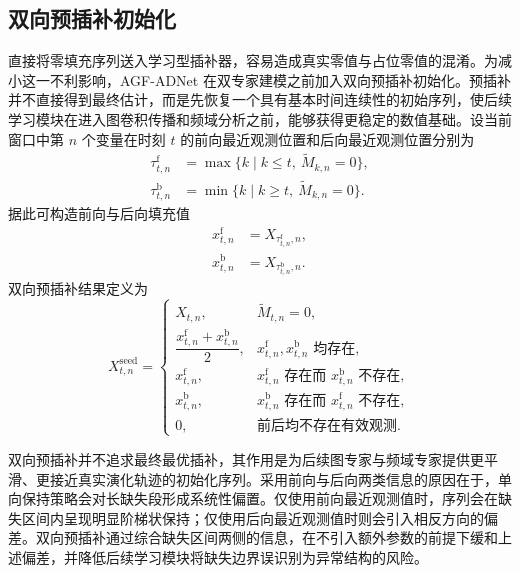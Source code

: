 \documentclass[bachelor, vlined]{DissertUESTC}
\begin{document}
    \subsection{双向预插补初始化}

    直接将零填充序列送入学习型插补器，容易造成真实零值与占位零值的混淆。为减小这一不利影响，AGF-ADNet 在双专家建模之前加入双向预插补初始化。预插补并不直接得到最终估计，而是先恢复一个具有基本时间连续性的初始序列，使后续学习模块在进入图卷积传播和频域分析之前，能够获得更稳定的数值基础。设当前窗口中第 $n$ 个变量在时刻 $t$ 的前向最近观测位置和后向最近观测位置分别为
    \begin{align}
        \tau_{t,n}^{\mathrm{f}} &= \max\{k \mid k \leq t,\ \widetilde{M}_{k,n}=0\}, \\
        \tau_{t,n}^{\mathrm{b}} &= \min\{k \mid k \geq t,\ \widetilde{M}_{k,n}=0\}.
    \end{align}
    据此可构造前向与后向填充值
    \begin{align}
        x_{t,n}^{\mathrm{f}} &= X_{\tau_{t,n}^{\mathrm{f}},n}, \\
        x_{t,n}^{\mathrm{b}} &= X_{\tau_{t,n}^{\mathrm{b}},n}.
    \end{align}
    双向预插补结果定义为
    \begin{equation}
        X_{t,n}^{\mathrm{seed}} =
        \begin{cases}
            X_{t,n}, & \widetilde{M}_{t,n}=0, \\
            \dfrac{x_{t,n}^{\mathrm{f}} + x_{t,n}^{\mathrm{b}}}{2}, & x_{t,n}^{\mathrm{f}},x_{t,n}^{\mathrm{b}} \text{ 均存在}, \\
            x_{t,n}^{\mathrm{f}}, & x_{t,n}^{\mathrm{f}} \text{ 存在而 } x_{t,n}^{\mathrm{b}} \text{ 不存在}, \\
            x_{t,n}^{\mathrm{b}}, & x_{t,n}^{\mathrm{b}} \text{ 存在而 } x_{t,n}^{\mathrm{f}} \text{ 不存在}, \\
            0, & \text{前后均不存在有效观测}.
        \end{cases}
    \end{equation}

    双向预插补并不追求最终最优插补，其作用是为后续图专家与频域专家提供更平滑、更接近真实演化轨迹的初始化序列。采用前向与后向两类信息的原因在于，单向保持策略会对长缺失段形成系统性偏置。仅使用前向最近观测值时，序列会在缺失区间内呈现明显阶梯状保持；仅使用后向最近观测值时则会引入相反方向的偏差。双向预插补通过综合缺失区间两侧的信息，在不引入额外参数的前提下缓和上述偏差，并降低后续学习模块将缺失边界误识别为异常结构的风险。
\end{document}
